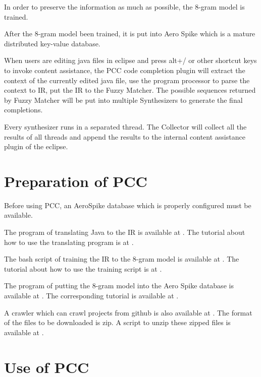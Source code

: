 \documentclass{sig-alternate-05-2015}
\begin{document}
In order to preserve the information as much as possible, the 8-gram model is trained.

After the 8-gram model been trained, it is put into Aero Spike\cite{aerospikedocs} which is a mature distributed key-value database.

When users are editing java files in eclipse and press alt+/ or other shortcut keys to invoke content assistance, the PCC code completion plugin will extract the context of the currently edited java file, use the program processor to parse the context to IR, put the IR to the Fuzzy Matcher. The possible sequences returned by Fuzzy Matcher will be put into multiple Synthesizers to generate the final completions.

Every synthesizer runs in a separated thread. The Collector will collect all the results of all threads and append the results to the internal content assistance plugin of the eclipse.

\section{Preparation of PCC}

Before using PCC, an AeroSpike database which is properly configured must be available.

The program of translating Java to the IR is available at \cite{programprocessor}. The tutorial about how to use the translating program is at \cite{programprocessortutorial}.

The bash script of training the IR to the 8-gram model is available at \cite{ngramtrain}. The tutorial about how to use the training script is at \cite{ngramtraintutorial}.

The program of putting the 8-gram model into the Aero Spike database is available at \cite{modeltoaero}. The corresponding tutorial is available at \cite{modeltoaerotutorial}.

A crawler which can crawl projects from github is also available at \cite{gitcrawler}. The format of the files to be downloaded is zip. A script to unzip these zipped files is available at \cite{unzipscript}.

\section{Use of PCC}
\end{document}
